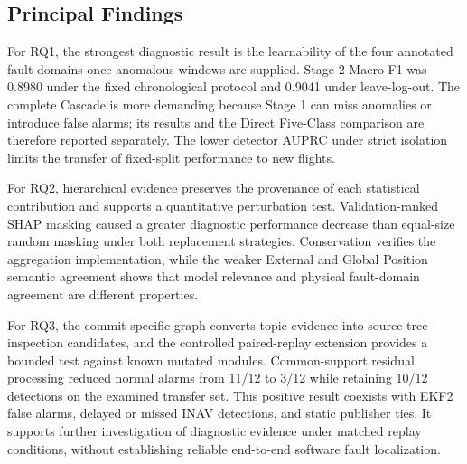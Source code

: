 \subsection{Principal Findings}

For RQ1, the strongest diagnostic result is the learnability of the four annotated fault domains once anomalous windows are supplied. Stage 2 Macro-F1 was 0.8980 under the fixed chronological protocol and 0.9041 under leave-log-out. The complete Cascade is more demanding because Stage 1 can miss anomalies or introduce false alarms; its results and the Direct Five-Class comparison are therefore reported separately. The lower detector AUPRC under strict isolation limits the transfer of fixed-split performance to new flights.

For RQ2, hierarchical evidence preserves the provenance of each statistical contribution and supports a quantitative perturbation test. Validation-ranked SHAP masking caused a greater diagnostic performance decrease than equal-size random masking under both replacement strategies. Conservation verifies the aggregation implementation, while the weaker External and Global Position semantic agreement shows that model relevance and physical fault-domain agreement are different properties.

For RQ3, the commit-specific graph converts topic evidence into source-tree inspection candidates, and the controlled paired-replay extension provides a bounded test against known mutated modules. Common-support residual processing reduced normal alarms from 11/12 to 3/12 while retaining 10/12 detections on the examined transfer set. This positive result coexists with EKF2 false alarms, delayed or missed INAV detections, and static publisher ties. It supports further investigation of diagnostic evidence under matched replay conditions, without establishing reliable end-to-end software fault localization.

